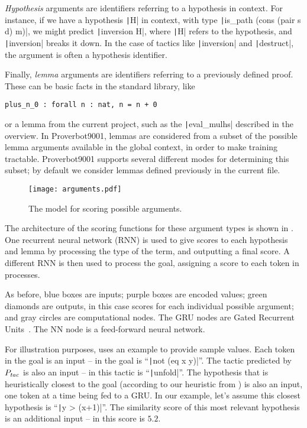 \documentclass[sigplan,screen]{acmart}
\newcommand{\name}{Proverbot9001\xspace}
\newcommand{\coqinline}[1]{\texttt|#1|}
\newcommand{\PTac}{P_{\it tac}}
\renewcommand{\>}{\quad}
\begin{document}
\emph{Hypothesis} arguments are identifiers referring to a hypothesis in context.
For instance,
if we have a hypothesis \coqinline{H} in context,
with type \coqinline{is_path (cons (pair s d) m)},
we might predict \coqinline{inversion H},
  where \coqinline{H} refers to the hypothesis,
  and \coqinline{inversion} breaks it down.
In the case of tactics like \coqinline{inversion} and \coqinline{destruct},
  the argument is often a hypothesis identifier.

Finally, \emph{lemma} arguments are identifiers referring to a previously defined proof.
These can be basic facts in the standard library, like
\begin{verbatim}
plus_n_0 : forall n : nat, n = n + 0
\end{verbatim}
or a lemma from the current project,
  such as the \coqinline{eval_mulhs} described in the overview.
In \name{}, lemmas are considered from a subset of the possible
  lemma arguments available in the global context,
  in order to make training tractable.
\name{} supports several different modes for determining this subset;
  by default we consider lemmas defined previously in the current file.

\begin{figure}
\texttt{[image: arguments.pdf]}
\caption{The model for scoring possible arguments.}
\label{fig:arguments}
\end{figure}

The architecture of the scoring functions for these argument types is shown in .
One recurrent neural network (RNN) is used to give scores to each hypothesis and lemma
  by processing the type of the term, and outputting a final score.
A different RNN is then used to process the goal, assigning a score to each token in processes.

As before, blue boxes are inputs; purple boxes are encoded values; green diamonds are outputs, in this case scores for each individual possible argument; and gray circles are computational nodes.
The GRU nodes are Gated Recurrent Units~\cite{gru}.
The NN node is a feed-forward neural network.

For illustration purposes,  uses an example to provide sample values.
Each token in the goal is an input -- in  the goal is ``\coqinline{not (eq x y)}''.
The tactic predicted by $\PTac$ is also an input -- in  this tactic is ``\coqinline{unfold}''.
The hypothesis that is heuristically closest to the goal
  (according to our heuristic from ) is also an input,
  one token at a time being fed to a GRU.
In our example,
  let's assume this closest hypothesis is ``\coqinline{y > (x+1)}''.
The similarity score of this most relevant hypothesis is an additional input --
  in  this score is $5.2$.
\end{document}
